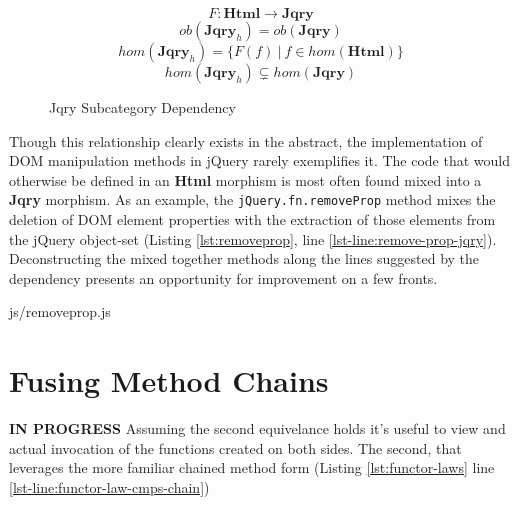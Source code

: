 \documentclass[preprint, leqno]{sigplanconf}
\begin{document}
\begin{figure}
\vspace{-10pt}
\begin{equation}
F : \mathbf{Html} \to \mathbf{Jqry}
\end{equation}
\vspace{-10pt}
\begin{equation}
ob(\mathbf{Jqry}_{h}) = ob(\mathbf{Jqry})
\end{equation}
\vspace{-10pt}
\begin{equation}
hom(\mathbf{Jqry}_{h}) = \{ F(f)\ |\ f \in hom(\mathbf{Html}) \}
\end{equation}
\vspace{-10pt}
\begin{equation}
hom(\mathbf{Jqry}_{h}) \subsetneq hom(\mathbf{Jqry})
\end{equation}
\vspace{-10pt}
\caption{Jqry Subcategory Dependency}
\vspace{-10pt}
\label{fig:dependent-sub-cat}
\end{figure}

Though this relationship clearly exists in the abstract, the implementation of DOM manipulation methods in jQuery rarely exemplifies it. The code that would otherwise be defined in an \textbf{Html} morphism is most often found mixed into a \textbf{Jqry} morphism. As an example, the \verb|jQuery.fn.removeProp| method mixes the deletion of DOM element properties with the extraction of those elements from the jQuery object-set (Listing \ref{lst:removeprop}, line \ref{lst-line:remove-prop-jqry}). Deconstructing the mixed together methods along the lines suggested by the dependency presents an opportunity for improvement on a few fronts.

\begin{lstinputlisting}[
    language=JavaScript,
    caption={Satisfying the Functor Laws},
    label={lst:removeprop},
    escapeinside={@}{@}
]{js/removeprop.js}
\end{lstinputlisting}

\section{Fusing Method Chains}\label{sec:fusing-method-chains}

\textbf{IN PROGRESS}
Assuming the second equivelance holds it's useful to view and actual invocation of the functions created on both sides. The second, that leverages the more familiar chained method form (Listing \ref{lst:functor-laws} line \ref{lst-line:functor-law-cmps-chain})
\end{document}
